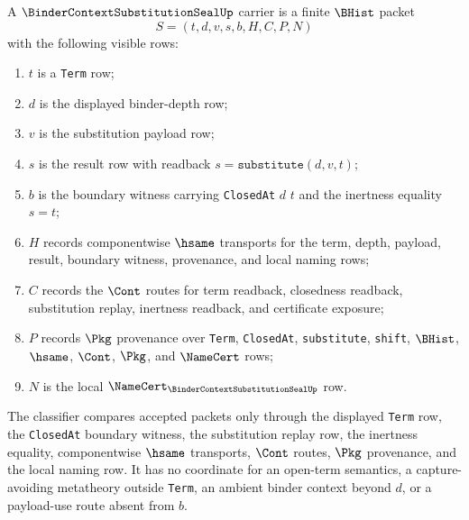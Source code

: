 \begin{definition}
\label{def:binder-context-substitution-seal-carrier}
A $\BinderContextSubstitutionSealUp$ carrier is a finite $\BHist$ packet
$$
S=(t,d,v,s,b,H,C,P,N)
$$
with the following visible rows:
\begin{enumerate}
\item $t$ is a \texttt{Term} row;
\item $d$ is the displayed binder-depth row;
\item $v$ is the substitution payload row;
\item $s$ is the result row with readback $s=\texttt{substitute}(d,v,t)$;
\item $b$ is the boundary witness carrying \texttt{ClosedAt} $d$ $t$ and the inertness equality $s=t$;
\item $H$ records componentwise $\hsame$ transports for the term, depth, payload, result, boundary witness, provenance, and local naming rows;
\item $C$ records the $\Cont$ routes for term readback, closedness readback, substitution replay, inertness readback, and certificate exposure;
\item $P$ records $\Pkg$ provenance over \texttt{Term}, \texttt{ClosedAt}, \texttt{substitute}, \texttt{shift}, $\BHist$, $\hsame$, $\Cont$, $\Pkg$, and $\NameCert$ rows;
\item $N$ is the local $\NameCert_{\BinderContextSubstitutionSealUp}$ row.
\end{enumerate}
The classifier compares accepted packets only through the displayed \texttt{Term} row, the \texttt{ClosedAt} boundary witness, the substitution replay row, the inertness equality, componentwise $\hsame$ transports, $\Cont$ routes, $\Pkg$ provenance, and the local naming row. It has no coordinate for an open-term semantics, a capture-avoiding metatheory outside \texttt{Term}, an ambient binder context beyond $d$, or a payload-use route absent from $b$.
\end{definition}

